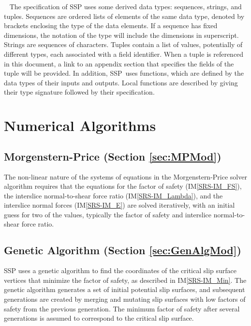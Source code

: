 \documentclass[12pt, titlepage]{article}
\newcommand{\progname}{SSP}
\begin{document}
~\newline
The specification of \progname{} uses some derived data types: sequences, 
strings, and tuples. Sequences are ordered lists of elements of the same data 
type, denoted by brackets enclosing the type of the data elements. If a 
sequence has fixed dimensions, the notation of the type will include the 
dimensions in superscript. Strings are sequences of characters. Tuples contain 
a list of values, potentially of different types, each associated with a field 
identifier. When a tuple is referenced in this document, a link to an appendix 
section that specifies the fields of the tuple will be provided. In addition, 
\progname \ uses functions, which are defined by the data types of their inputs 
and outputs. Local functions are described by giving their type signature 
followed by their specification.


\section{Numerical Algorithms}

\subsection*{Morgenstern-Price (Section \ref{sec:MPMod})}
The non-linear nature of the systems of equations in the Morgenstern-Price 
solver algorithm requires that the equations for
the factor of safety (IM\ref{SRS-IM_FS}), the interslice normal-to-shear force 
ratio (IM\ref{SRS-IM_Lambda}), and the interslice normal forces 
(IM\ref{SRS-IM_E}) are solved iteratively, with an initial guess for two of the 
values, typically the factor of safety and interslice normal-to-shear force 
ratio.

\subsection*{Genetic Algorithm (Section \ref{sec:GenAlgMod})}
\progname{} uses a genetic algorithm to find the coordinates of the
critical slip surface vertices that minimize the factor of safety, as described 
in IM\ref{SRS-IM_Min}. The genetic algorithm generates a set of initial 
potential slip surfaces, and subsequent generations are created by merging and 
mutating slip surfaces with low factors of safety from the previous generation. 
The minimum factor of safety after several generations is assumed to correspond 
to the critical slip surface.
\end{document}
